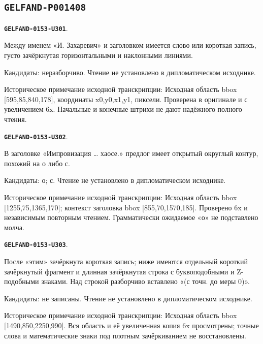 \documentclass[11pt]{article}
\theoremstyle{definition}
\theoremstyle{remark}
\begin{document}
\subsection*{\texttt{GELFAND-P001408}}
\par\noindent\leavevmode{}\label{GELFAND-0153-U301}\label{GELFAND-P001408:cancelled-title:note}\textbf{\texttt{GELFAND-0153-U301}}.\nopagebreak[4]\par
Между именем «И. Захаревич» и заголовком имеется слово или короткая запись, густо зачёркнутая горизонтальными и наклонными линиями.\par
Кандидаты: неразборчиво. Чтение не установлено в дипломатическом исходнике.\par
Историческое примечание исходной транскрипции: Исходная область bbox [595,85,840,178], координаты x0,y0,x1,y1, пиксели. Проверена в оригинале и с увеличением 6x. Начальные и конечные штрихи не дают надёжного полного чтения.\par\medskip
\par\noindent\leavevmode{}\label{GELFAND-0153-U302}\label{GELFAND-P001408:title-preposition:note}\textbf{\texttt{GELFAND-0153-U302}}.\nopagebreak[4]\par
В заголовке «Импровизация … хаосе.» предлог имеет открытый округлый контур, похожий на о либо с.\par
Кандидаты: о; с. Чтение не установлено в дипломатическом исходнике.\par
Историческое примечание исходной транскрипции: Исходная область bbox [1255,75,1365,170]; контекст заголовка bbox [855,70,1570,185]. Проверено 6x и независимым повторным чтением. Грамматически ожидаемое «о» не подставлено молча.\par\medskip
\par\noindent\leavevmode{}\label{GELFAND-0153-U303}\label{GELFAND-P001408:baker-cancellations:note}\textbf{\texttt{GELFAND-0153-U303}}.\nopagebreak[4]\par
После «этим» зачёркнута короткая запись; ниже имеются отдельный короткий зачёркнутый фрагмент и длинная зачёркнутая строка с буквоподобными и Z-подобными знаками. Над строкой разборчиво вставлено «(с точн. до меры 0)».\par
Кандидаты: не записаны. Чтение не установлено в дипломатическом исходнике.\par
Историческое примечание исходной транскрипции: Исходная область bbox [1490,850,2250,990]. Вся область и её увеличенная копия 6x просмотрены; точные слова и математические знаки под плотным зачёркиванием не восстановлены.\par\medskip
\end{document}
